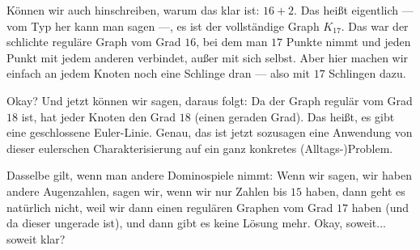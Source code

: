 \begin{spoken-clean}[00:29:55 - 00:31:34]
Können wir auch hinschreiben, warum das klar ist: $16 + 2$. Das heißt eigentlich --- vom Typ her kann man sagen ---, es ist der vollständige Graph $K_{17}$. Das war der schlichte reguläre Graph vom Grad $16$, bei dem man $17$ Punkte nimmt und jeden Punkt mit jedem anderen verbindet, außer mit sich selbst. Aber hier machen wir einfach an jedem Knoten noch eine Schlinge dran --- also mit $17$ Schlingen dazu. 

Okay? Und jetzt können wir sagen, daraus folgt: Da der Graph regulär vom Grad $18$ ist, hat jeder Knoten den Grad $18$ (einen geraden Grad). Das heißt, es gibt eine geschlossene Euler-Linie.  Genau, das ist jetzt sozusagen eine Anwendung von dieser eulerschen Charakterisierung auf ein ganz konkretes (Alltags-)Problem.

Dasselbe gilt, wenn man andere Dominospiele nimmt: Wenn wir sagen, wir haben andere Augenzahlen, sagen wir, wenn wir nur Zahlen bis $15$ haben, dann geht es natürlich nicht, weil wir dann einen regulären Graphen vom Grad $17$ haben (und da dieser ungerade ist), und dann gibt es keine Lösung mehr. Okay, soweit... soweit klar? 
\end{spoken-clean}

